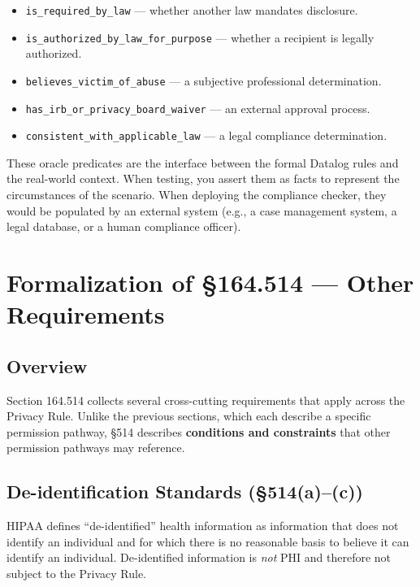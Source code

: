 \documentclass[11pt,letterpaper]{article}
\begin{document}
\begin{itemize}
  \item \texttt{is\_required\_by\_law} --- whether another law mandates disclosure.
  \item \texttt{is\_authorized\_by\_law\_for\_purpose} --- whether a recipient is legally authorized.
  \item \texttt{believes\_victim\_of\_abuse} --- a subjective professional determination.
  \item \texttt{has\_irb\_or\_privacy\_board\_waiver} --- an external approval process.
  \item \texttt{consistent\_with\_applicable\_law} --- a legal compliance determination.
\end{itemize}

These oracle predicates are the interface between the formal Datalog rules and the real-world context. When testing, you assert them as facts to represent the circumstances of the scenario. When deploying the compliance checker, they would be populated by an external system (e.g., a case management system, a legal database, or a human compliance officer).


\section{Formalization of \S 164.514 --- Other Requirements}
\label{sec:514}

\subsection{Overview}

Section 164.514 collects several cross-cutting requirements that apply across the Privacy Rule. Unlike the previous sections, which each describe a specific permission pathway, \S 514 describes \textbf{conditions and constraints} that other permission pathways may reference.

\subsection{De-identification Standards (\S 514(a)--(c))}

HIPAA defines ``de-identified'' health information as information that does not identify an individual and for which there is no reasonable basis to believe it can identify an individual. De-identified information is \emph{not} PHI and therefore not subject to the Privacy Rule.
\end{document}
